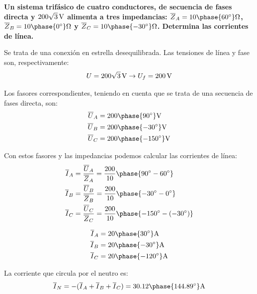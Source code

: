         \vspace{4mm}
        \begin{example}\label{ej.estrella-deseq}
\textbf{          Un sistema trifásico de cuatro conductores, de secuencia de fases
directa y $\SI[parse-numbers=false]{200\sqrt{3}}{\volt}$ alimenta a
tres impedancias:
$\overline{Z}_{A} =
{10\phase{\ang{60}}}\unit{\ohm}$,
$\overline{Z}_{B} = {10\phase{\ang{0}}}\unit{\ohm}$
y
$\overline{Z}_{C} =
{10\phase{\ang{-30}}}\unit{\ohm}$. Determina las
corrientes de línea.}

Se trata de una conexión en estrella desequilibrada. Las tensiones de línea y fase son, respectivamente:
\[ U = \SI[parse-numbers=false]{200\sqrt{3}}{\volt} \rightarrow U_f =
  \SI{200}{\volt}
\]

Los fasores correspondientes, teniendo en cuenta que se trata de una secuencia de fases directa, son:
\begin{align*}
  \overline{U}_A &= {200\phase{\ang{90}}}\unit{\volt}\\
  \overline{U}_B &= {200\phase{\ang{-30}}}\unit{\volt}\\
  \overline{U}_C &= {200\phase{\ang{-150}}}\unit{\volt}\\
\end{align*}

Con estos fasores y las impedancias podemos calcular las corrientes de línea:
\begin{align*}
  \overline{I}_A &= \frac{\overline{U}_A}{\overline{Z}_A} = \frac{200}{10}\phase{\ang{90} - \ang{60}} \\
  \overline{I}_B &= \frac{\overline{U}_B}{\overline{Z}_B} = \frac{200}{10}\phase{\ang{-30} - \ang{0}}\\
  \overline{I}_C &= \frac{\overline{U}_C}{\overline{Z}_C} = \frac{200}{10}\phase{\ang{-150} - (\ang{-30})}
\end{align*}

 \begin{align*}
   \overline{I}_A &= {20\phase{\ang{30}}}\unit{\ampere}\\
   \overline{I}_B &= {20\phase{\ang{-30}}}\unit{\ampere}\\
   \overline{I}_C &= {20\phase{\ang{-120}}}\unit{\ampere}
 \end{align*}

 La corriente que circula por el neutro es:
 \[
   \overline{I}_N = -(\overline{I}_A + \overline{I}_B +
   \overline{I}_C) = {30.12\phase{\ang{144.89}}}\unit{\ampere}
 \]


\end{example}
	
